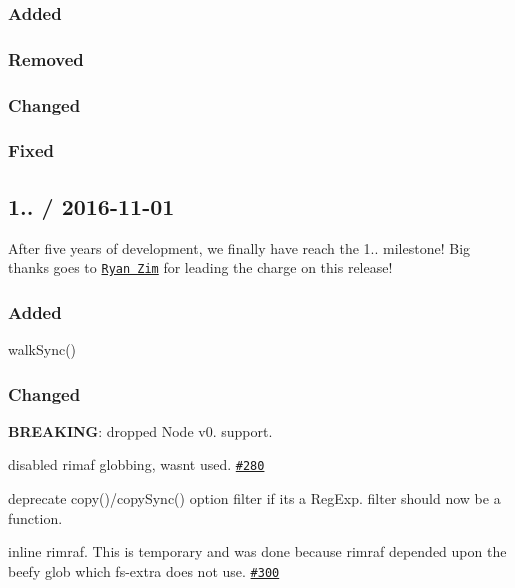 \subsubsection*{Added}

\subsubsection*{Removed}

\subsubsection*{Changed}

\subsubsection*{Fixed}

\subsection*{1.. / 2016-\/11-\/01 }

After five years of development, we finally have reach the 1.. milestone! Big thanks goes to \href{https://github.com/RyanZim}{\tt Ryan Zim} for leading the charge on this release!

\subsubsection*{Added}


\begin{DoxyItemize}
\item {\ttfamily walk\+Sync()}
\end{DoxyItemize}

\subsubsection*{Changed}


\begin{DoxyItemize}
\item {\bfseries B\+R\+E\+A\+K\+I\+NG}\+: dropped Node v0. support.
\item disabled {\ttfamily rimaf} globbing, wasn\textquotesingle{}t used. \href{https://github.com/jprichardson/node-fs-extra/pull/280}{\tt \#280}
\item deprecate {\ttfamily copy()/copy\+Sync()} option {\ttfamily filter} if it\textquotesingle{}s a {\ttfamily Reg\+Exp}. {\ttfamily filter} should now be a function.
\item inline {\ttfamily rimraf}. This is temporary and was done because {\ttfamily rimraf} depended upon the beefy {\ttfamily glob} which {\ttfamily fs-\/extra} does not use. \href{https://github.com/jprichardson/node-fs-extra/pull/300}{\tt \#300}
\end{DoxyItemize}

